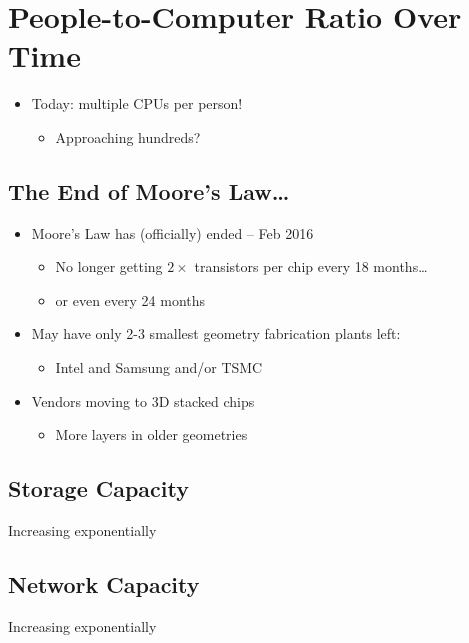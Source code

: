 \documentclass{article}
\begin{document}
\section{People-to-Computer Ratio Over Time}
\begin{itemize}
\item Today: multiple CPUs per person!
\begin{itemize}
\item Approaching hundreds?
\end{itemize}
\end{itemize}
\subsection{The End of Moore's Law\dots}
\begin{itemize}
\item Moore's Law has (officially) ended -- Feb 2016
\begin{itemize}
\item No longer getting \(2\times\) transistors per chip every 18 months\dots
\item or even every 24 months
\end{itemize}
\item May have only 2-3 smallest geometry fabrication plants left:
\begin{itemize}
\item Intel and Samsung and/or TSMC
\end{itemize}
\item Vendors moving to 3D stacked chips
\begin{itemize}
\item More layers in older geometries
\end{itemize}
\end{itemize}
\subsection{Storage Capacity}
Increasing exponentially
\subsection{Network Capacity}
Increasing exponentially
\end{document}
